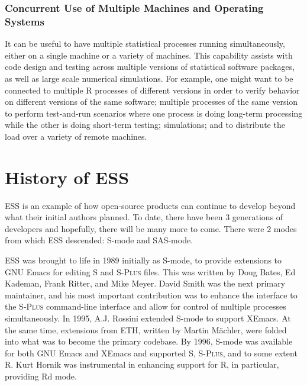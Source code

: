 \documentclass{article}
\newcommand*{\Splus}{\textsc{S-Plus}}
\begin{document}
\subsubsection{Concurrent Use of Multiple Machines and Operating
  Systems}
\label{sec:conc-use-mult}

It can be useful to have multiple statistical processes running
simultaneously, either on a single machine or a variety of machines.
This capability assists with code design and testing across multiple
versions of statistical software packages, as well as large scale
numerical simulations.  For example, one might want to be connected to
multiple R processes of different versions in order to verify behavior
on different versions of the same software; multiple processes of the
same version to perform test-and-run scenarios where one process is
doing long-term processing while the other is doing short-term
testing; simulations; and to distribute the load over a variety of
remote machines.

\section{History of ESS}
\label{sec:ESS:history}

ESS is an example of how open-source products can continue to
develop beyond what their initial authors planned.  To date, there have been 3
generations of developers and hopefully, there will be many more to come.
There were 2 modes from which ESS descended:  S-mode and SAS-mode.

ESS was brought to life in 1989 initially as S-mode, to
provide extensions to GNU Emacs for editing S and \Splus{} files.  This
was written by Doug Bates, Ed Kademan, Frank Ritter, and
Mike Meyer.  David Smith was the next primary maintainer, and his most
important contribution was to enhance the interface to the \Splus{}
command-line interface and allow for control of multiple processes
simultaneously.  In 1995, A.J.  Rossini extended S-mode to support
XEmacs.  At the
same time, extensions from ETH, written by Martin M{\"a}chler, were folded
into what was to become the primary codebase.  By 1996,
S-mode was available for both GNU Emacs and XEmacs and supported S, \Splus, and
to some extent R.  Kurt Hornik was instrumental in enhancing support
for R, in particular, providing Rd mode.
\end{document}
